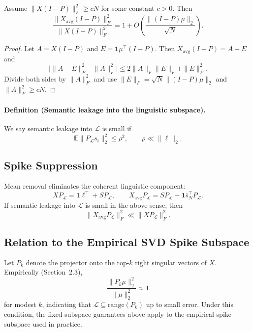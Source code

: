 \begin{corollary}
\label{cor:app_tail_ratio}
Assume $\|X(I-P)\|_F^2 \ge cN$ for some constant $c>0$.
Then
\[
\frac{\|X_{\mathrm{avg}}(I-P)\|_F^2}{\|X(I-P)\|_F^2}
=
1 + O\!\left(\frac{\|(I-P)\mu\|_2}{\sqrt{N}}\right).
\]
\end{corollary}

\begin{proof}
Let $A=X(I-P)$ and $E=\mathbf{1}\mu^\top(I-P)$.
Then $X_{\mathrm{avg}}(I-P)=A-E$ and
\[
\bigl|\|A-E\|_F^2 - \|A\|_F^2\bigr|
\le 2\|A\|_F\|E\|_F + \|E\|_F^2.
\]
Divide both sides by $\|A\|_F^2$ and use $\|E\|_F=\sqrt{N}\|(I-P)\mu\|_2$ and
$\|A\|_F^2\ge cN$.
\end{proof}

\paragraph{Definition (Semantic leakage into the linguistic subspace).}
We say semantic leakage into $\mathcal L$ is small if
\[
\mathbb{E}\|P_{\mathcal L} s_i\|_2^2 \le \rho^2,
\qquad \rho \ll \|\ell\|_2.
\]

\subsection{Spike Suppression}

\begin{theorem}
Mean removal eliminates the coherent linguistic component:
\[
XP_{\mathcal L} = \mathbf{1}\ell^\top + SP_{\mathcal L},
\qquad
X_{\mathrm{avg}}P_{\mathcal L} = SP_{\mathcal L} - \mathbf{1}\bar{s}_N^\top P_{\mathcal L}.
\]
If semantic leakage into $\mathcal L$ is small in the above sense, then
\[
\|X_{\mathrm{avg}}P_{\mathcal L}\|_F^2 \ll \|XP_{\mathcal L}\|_F^2.
\]
\end{theorem}

\subsection{Relation to the Empirical SVD Spike Subspace}

Let $P_k$ denote the projector onto the top-$k$ right singular vectors of $X$.
Empirically (Section~2.3),
\[
\frac{\|P_k \mu\|_2^2}{\|\mu\|_2^2} \approx 1
\]
for modest $k$, indicating that $\mathcal L \subseteq \mathrm{range}(P_k)$ up to
small error.
Under this condition, the fixed-subspace guarantees above apply to the empirical
spike subspace used in practice.

